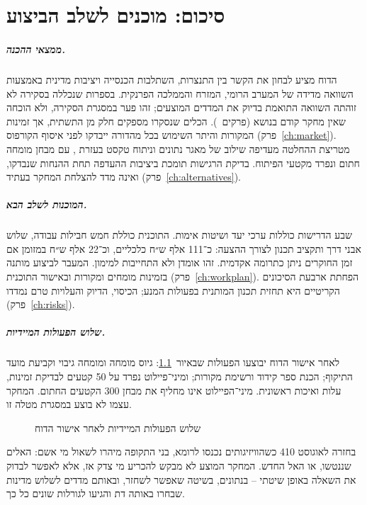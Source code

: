 
\chapter{סיכום: מוכנים לשלב הביצוע}
\label{ch:summary}

\paragraph{ממצאי ההכנה.} הדוח מציע לבחון את הקשר בין התנצרות, השתלבות הכנסייה ויציבות מדינית באמצעות השוואה מדידה של המערב הרומי, המזרח והממלכה הפרנקית. בספרות שנכללה בסקירה לא זוהתה השוואה התואמת בדיוק את המדדים המוצעים; זהו פער במסגרת הסקירה, ולא הוכחה שאין מחקר קודם בנושא (פרקים~\LR{\ref{ch:problem}--\ref{ch:literature}}). הכלים שנסקרו מספקים חלק מן התשתית, אך זמינות המקורות והיתר השימוש בכל מהדורה ייבדקו לפני איסוף הקורפוס (פרק~\ref{ch:market}). מטריצת ההחלטה מעדיפה שילוב של מאגר נתונים וניתוח טקסט בעזרת , עם מבחן מומחה חתום ונפרד מקטעי הפיתוח. בדיקת הרגישות תומכת ביציבות ההעדפה תחת ההנחות שנבדקו, ואינה מדד להצלחת המחקר בעתיד (פרק~\ref{ch:alternatives}).

\paragraph{המוכנות לשלב הבא.} שבע הדרישות כוללות ערכי יעד ושיטות אימות. התוכנית כוללת חמש חבילות עבודה, שלוש אבני דרך ותקציב תכנון לצורך ההצעה: כ־111 אלף ש״ח כלכליים, וכ־22 אלף ש״ח במזומן אם זמן החוקרים ניתן כתרומה אקדמית. זהו אומדן ולא התחייבות למימון. המעבר לביצוע מותנה בזמינות מומחים ומקורות ובאישור התוכנית (פרק~\ref{ch:workplan}). הפחתת ארבעת הסיכונים הקריטיים היא תחזית תכנון המותנית בפעולות המנע; הכיסוי, הדיוק והעלויות טרם נמדדו (פרק~\ref{ch:risks}).

\paragraph{שלוש הפעולות המיידיות.} לאחר אישור הדוח יבוצעו הפעולות שבאיור~\ref{fig:next-steps}: גיוס מומחה ומומחה גיבוי וקביעת מועד התיקוף; הכנת ספר קידוד ורשימת מקורות; ומיני־פיילוט נפרד על 50 קטעים לבדיקת זמינות, עלות ואיכות ראשונית. מיני־הפיילוט אינו מחליף את מבחן 300 הקטעים החתום. המחקר עצמו לא בוצע במסגרת מטלה זו.

\begin{figure}[htbp]
  \centering
  
  \caption{שלוש הפעולות המיידיות לאחר אישור הדוח}
  \label{fig:next-steps}
\end{figure}

\begin{keybox}{בחזרה לאוגוסט 410}
כשהוויזיגותים נכנסו לרומא, בני התקופה מיהרו לשאול מי אשם: האלים שננטשו, או האל החדש. המחקר המוצע לא מבקש להכריע מי צדק אז, אלא לאפשר לבדוק את השאלה באופן שיטתי – בנתונים, בשיטה שאפשר לשחזר, ובאותם מדדים לשלוש מדינות שבחרו באותה דת והגיעו לגורלות שונים כל כך.
\end{keybox}
